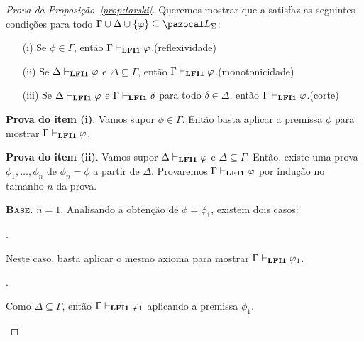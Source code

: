         \begin{proof}[Prova da Proposição~\ref{prop:tarski}]
            Queremos mostrar que a \lfium{} satisfaz as seguintes condições para todo $\Gamma \cup \Delta \cup \{\phi\} \subseteq \ling{}$:
            \begin{itemize}
                \item [(i)] Se $\phi \in \Gamma$, então $\Gamma \vdash_{{\normalfont\textbf{LFI1}}{}} \varphi$.\hfill(reflexividade)
                \item [(ii)] Se $\Delta \vdash_{{\normalfont\textbf{LFI1}}{}} \varphi$ e $\Delta \subseteq \Gamma$, então $\Gamma \vdash_{{\normalfont\textbf{LFI1}}{}} \varphi$.\hfill(monotonicidade)
                \item [(iii)] Se $\Delta \vdash_{{\normalfont\textbf{LFI1}}{}} \varphi$ e $\Gamma \vdash_{{\normalfont\textbf{LFI1}}{}} \delta$ para todo $\delta \in \Delta$, então $\Gamma \vdash_{{\normalfont\textbf{LFI1}}{}} \varphi$.\hfill(corte)
            \end{itemize}
            \begin{adjustwidth}{1cm}{}
                \textbf{Prova do item (i)}. Vamos supor $\phi \in \Gamma$. Então basta aplicar a premissa $\phi$ para mostrar $\Gamma \vdash_{{\normalfont\textbf{LFI1}}{}} \varphi$.

                \noindent{}\textbf{Prova do item (ii)}. Vamos supor $\Delta \vdash_{{\normalfont\textbf{LFI1}}{}} \varphi$ e $\Delta \subseteq \Gamma$. Então, existe uma prova $\phi_1, \ldots, \phi_n$ de $\phi_n = \phi$ a partir de $\Delta$. Provaremos $\Gamma \vdash_{{\normalfont\textbf{LFI1}}{}} \varphi$ por indução no tamanho $n$ da prova.

                \begin{adjustwidth}{1cm}{}

                    \textbf{\textsc{Base.}} $n = 1$.
                    Analisando a obtenção de $\phi = \phi_1$, existem dois casos:

                    \begin{provaporcasos}

                    . 

                        Neste caso, basta aplicar o mesmo axioma para mostrar $\Gamma \vdash_{{\normalfont\textbf{LFI1}}{}} \varphi_1$.

                    \casodeprova{$\phi_1 \in \Delta$}.

                        Como $\Delta \subseteq \Gamma$, então $\Gamma \vdash_{{\normalfont\textbf{LFI1}}{}} \varphi_1$ aplicando a premissa $\phi_1$.
                        

\end{provaporcasos}
\end{adjustwidth}
\end{adjustwidth}
\end{proof}

